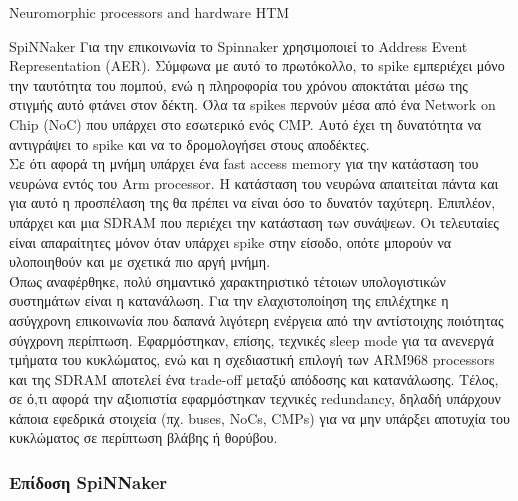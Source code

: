 \documentclass[a4paper,11pt]{article}
\begin{document}
\begin{section}{Neuromorphic processors and hardware HTM}
\begin{subsection}{SpiNNaker}
    Για την επικοινωνία το Spinnaker χρησιμοποιεί το Address Event Representation (AER). Σύμφωνα με αυτό το πρωτόκολλο, το spike εμπεριέχει μόνο την ταυτότητα του πομπού, ενώ η πληροφορία του χρόνου αποκτάται μέσω της στιγμής αυτό φτάνει στον δέκτη. Όλα τα spikes περνούν μέσα από ένα Νetwork on Chip (NoC) που υπάρχει στο εσωτερικό ενός CMP. Αυτό έχει τη δυνατότητα να αντιγράψει το spike και να το δρομολογήσει στους αποδέκτες.\\
    Σε ότι αφορά τη μνήμη υπάρχει ένα fast access memory για την κατάσταση του νευρώνα εντός του Arm processor. Η κατάσταση του νευρώνα απαιτείται πάντα και για αυτό η προσπέλαση της θα πρέπει να είναι όσο το δυνατόν ταχύτερη. Επιπλέον, υπάρχει και μια SDRAM που περιέχει την κατάσταση των συνάψεων. Οι τελευταίες είναι απαραίτητες μόνον όταν υπάρχει spike στην είσοδο, οπότε μπορούν να υλοποιηθούν και με σχετικά πιο αργή μνήμη.\\
    Όπως αναφέρθηκε, πολύ σημαντικό χαρακτηριστικό τέτοιων υπολογιστικών συστημάτων είναι η κατανάλωση. Για την ελαχιστοποίηση της επιλέχτηκε η ασύγχρονη επικοινωνία που δαπανά λιγότερη ενέργεια από την αντίστοιχης ποιότητας σύγχρονη περίπτωση. Εφαρμόστηκαν, επίσης, τεχνικές sleep mode για τα ανενεργά τμήματα του κυκλώματος, ενώ και η σχεδιαστική επιλογή των ARM968 processors και της SDRAM αποτελεί ένα  trade-off μεταξύ απόδοσης και κατανάλωσης. Τέλος, σε ό,τι αφορά την αξιοπιστία εφαρμόστηκαν τεχνικές redundancy, δηλαδή υπάρχουν κάποια εφεδρικά στοιχεία (πχ. buses, NoCs, CMPs) για να μην υπάρξει αποτυχία του κυκλώματος σε περίπτωση βλάβης ή θορύβου.\\

    \subsubsection{Επίδοση SpiNNaker}


\end{subsection}
\end{section}
\end{document}

